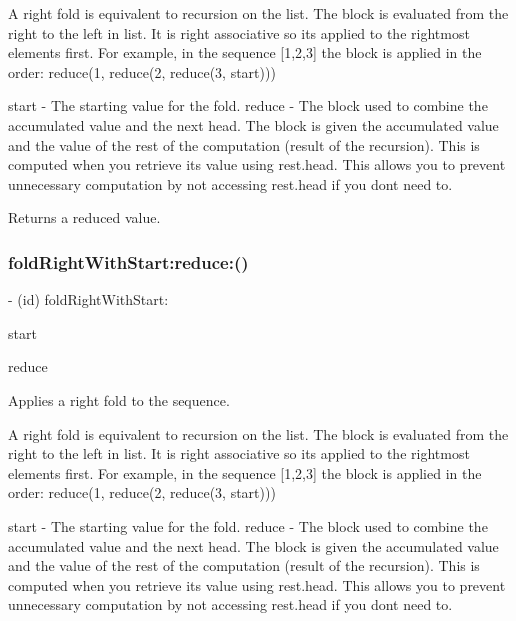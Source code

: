 A right fold is equivalent to recursion on the list. The block is evaluated from the right to the left in list. It is right associative so it\textquotesingle{}s applied to the rightmost elements first. For example, in the sequence \mbox{[}1,2,3\mbox{]} the block is applied in the order\+: reduce(1, reduce(2, reduce(3, start)))

start -\/ The starting value for the fold. reduce -\/ The block used to combine the accumulated value and the next head. The block is given the accumulated value and the value of the rest of the computation (result of the recursion). This is computed when you retrieve its value using {\ttfamily rest.\+head}. This allows you to prevent unnecessary computation by not accessing {\ttfamily rest.\+head} if you don\textquotesingle{}t need to.

Returns a reduced value. \mbox{\label{interface_r_a_c_sequence_abc932140e0279336ed6829b6f91b577e}} 
\subsubsection{\texorpdfstring{fold\+Right\+With\+Start\+:reduce\+:()}{foldRightWithStart:reduce:()}\hspace{0.1cm}{\footnotesize\ttfamily [2/3]}}
{\footnotesize\ttfamily -\/ (id) fold\+Right\+With\+Start\+: \begin{DoxyParamCaption}\item[{(id)}]{start }\item[{reduce:(id($^\wedge$)(id first, \mbox{\hyperlink{interface_r_a_c_sequence}{R\+A\+C\+Sequence}} $\ast$rest))}]{reduce }\end{DoxyParamCaption}}

Applies a right fold to the sequence.

A right fold is equivalent to recursion on the list. The block is evaluated from the right to the left in list. It is right associative so it\textquotesingle{}s applied to the rightmost elements first. For example, in the sequence \mbox{[}1,2,3\mbox{]} the block is applied in the order\+: reduce(1, reduce(2, reduce(3, start)))

start -\/ The starting value for the fold. reduce -\/ The block used to combine the accumulated value and the next head. The block is given the accumulated value and the value of the rest of the computation (result of the recursion). This is computed when you retrieve its value using {\ttfamily rest.\+head}. This allows you to prevent unnecessary computation by not accessing {\ttfamily rest.\+head} if you don\textquotesingle{}t need to.

